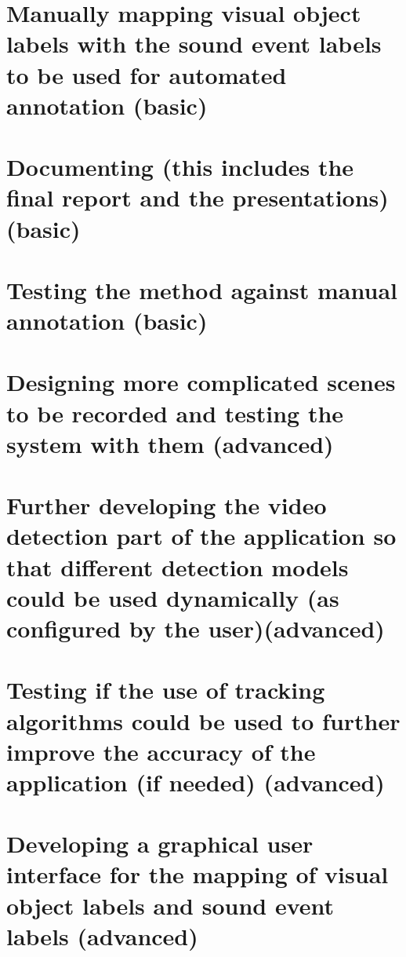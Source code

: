 \section{Manually mapping visual object labels with the sound event labels to be used for automated annotation (basic)}

\section{Documenting (this includes the final report and the presentations) (basic)}

\section{Testing the method against manual annotation (basic)}

\section{Designing more complicated scenes to be recorded and testing the system with them (advanced)}

\section{Further developing the video detection part of the application so that different detection models could be used dynamically (as configured by the user)(advanced)}

\section{Testing if the use of tracking algorithms could be used to further improve the accuracy of the application (if needed) (advanced)}

\section{Developing a graphical user interface for the mapping of visual object labels and sound event labels (advanced)}



